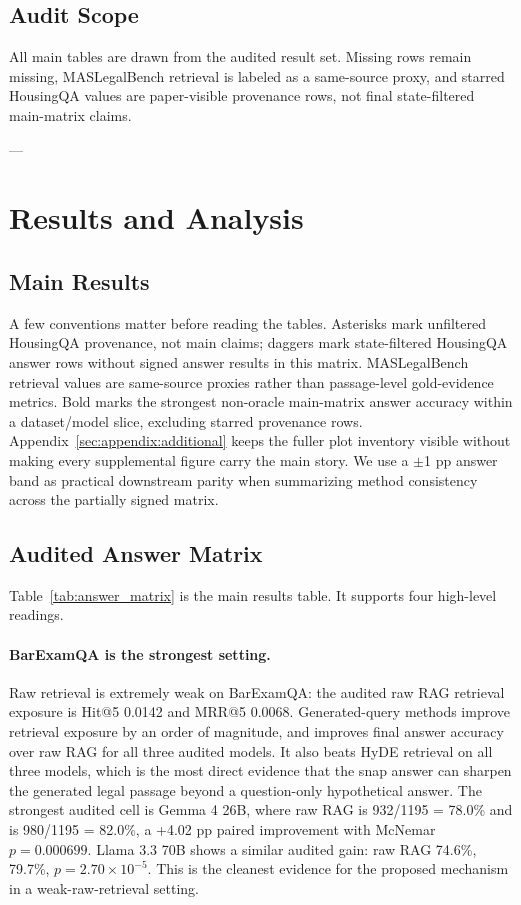 \subsection{Audit Scope}
All main tables are drawn from the audited result set. Missing rows remain
missing, MASLegalBench retrieval is labeled as a same-source proxy, and starred
HousingQA values are paper-visible provenance rows, not final state-filtered
main-matrix claims.

---
\section{Results and Analysis}\label{sec:analysis}

\subsection{Main Results}

A few conventions matter before reading the tables. Asterisks mark unfiltered
HousingQA provenance, not main claims; daggers mark state-filtered HousingQA
answer rows without signed answer results in this matrix. MASLegalBench
retrieval values are same-source proxies rather than passage-level gold-evidence metrics. Bold marks
the strongest non-oracle main-matrix answer accuracy within a dataset/model
slice, excluding starred provenance rows. Appendix~\ref{sec:appendix:additional}
keeps the fuller plot inventory visible without making every supplemental figure
carry the main story. We use a $\pm$1 pp answer band as practical downstream
parity when summarizing method consistency across the partially signed matrix.

\subsection{Audited Answer Matrix}



Table~\ref{tab:answer_matrix} is the main results table. It supports four
high-level readings.

\paragraph{BarExamQA is the strongest \hyre{} setting.}
Raw retrieval is extremely weak on BarExamQA: the audited raw RAG retrieval
exposure is Hit@5 0.0142 and MRR@5 0.0068. Generated-query methods improve
retrieval exposure by an order of magnitude, and \hyre{} improves final answer
accuracy over raw RAG for all three audited models. It also beats HyDE
retrieval on all three models, which is the most direct evidence that the snap
answer can sharpen the generated legal passage beyond a question-only
hypothetical answer. The strongest audited cell is Gemma 4 26B, where raw RAG
is 932/1195 = 78.0\% and \hyre{} is 980/1195 = 82.0\%, a +4.02 pp paired
improvement with McNemar $p=0.000699$. Llama 3.3 70B shows a similar audited
gain: raw RAG 74.6\%, \hyre{} 79.7\%, $p = 2.70\times 10^{-5}$. This is the
cleanest evidence for the proposed mechanism in a weak-raw-retrieval setting.


